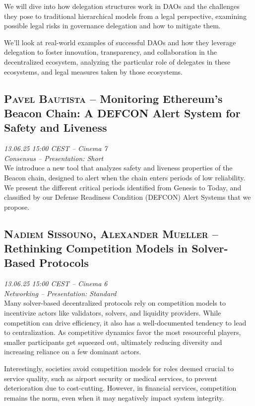 We will dive into how delegation structures work in DAOs and the challenges they pose to traditional hierarchical models from a legal perspective, examining possible legal risks in governance delegation and how to mitigate them.

We'll look at real-world examples of successful DAOs and how they leverage delegation to foster innovation, transparency, and collaboration in the decentralized ecosystem, analyzing the particular role of delegates in these ecosystems, and legal measures taken by those ecosystems.

\clearpage
\subsection {\textsc{Pavel Bautista}  -- Monitoring Ethereum’s Beacon Chain: A DEFCON Alert System for Safety and Liveness} \noindent \textit {13.06.25 15:00 CEST -- Cinema 7\\ Consensus -- Presentation: Short}\\[1em] We introduce a new tool that analyzes safety and liveness properties of the Beacon chain, designed to alert when the chain enters periods of low reliability. We present the different critical periods identified from Genesis to Today, and classified by our Defense Readiness Condition (DEFCON) Alert Systems that we propose.

\clearpage
\subsection {\textsc{Nadiem Sissouno, Alexander Mueller}  -- Rethinking Competition Models in Solver-Based Protocols} \noindent \textit {13.06.25 15:00 CEST -- Cinema 6\\ Networking -- Presentation: Standard}\\[1em] Many solver-based decentralized protocols rely on competition models to incentivize actors like validators, solvers, and liquidity providers. While competition can drive efficiency, it also has a well-documented tendency to lead to centralization. As competitive dynamics favor the most resourceful players, smaller participants get squeezed out, ultimately reducing diversity and increasing reliance on a few dominant actors.

Interestingly, societies avoid competition models for roles deemed crucial to service quality, such as airport security or medical services, to prevent deterioration due to cost-cutting. However, in financial services, competition remains the norm, even when it may negatively impact system integrity.

